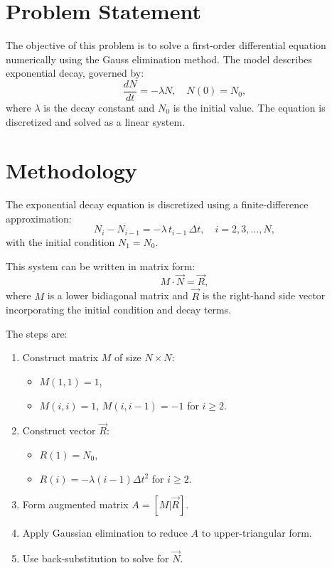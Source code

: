 \section*{Problem Statement} 
The objective of this problem is to solve a first-order differential equation numerically using the Gauss elimination method. The model describes exponential decay, governed by:
\[
\frac{dN}{dt} = -\lambda N, \quad N(0) = N_0,
\]
where $\lambda$ is the decay constant and $N_0$ is the initial value. The equation is discretized and solved as a linear system.

\section*{Methodology} 
The exponential decay equation is discretized using a finite-difference approximation:
\[
N_i - N_{i-1} = -\lambda \, t_{i-1} \, \Delta t, \quad i = 2,3,\ldots,N,
\]
with the initial condition $N_1 = N_0$.

This system can be written in matrix form:
\[
M \cdot \vec{N} = \vec{R},
\]
where $M$ is a lower bidiagonal matrix and $\vec{R}$ is the right-hand side vector incorporating the initial condition and decay terms.

The steps are:
\begin{enumerate}
  \item Construct matrix $M$ of size $N \times N$:
  \begin{itemize}
    \item $M(1,1) = 1$, 
    \item $M(i,i) = 1$, $M(i,i-1) = -1$ for $i \geq 2$.
  \end{itemize}
  \item Construct vector $\vec{R}$:
  \begin{itemize}
    \item $R(1) = N_0$, 
    \item $R(i) = -\lambda (i-1) \Delta t^2$ for $i \geq 2$.
  \end{itemize}
  \item Form augmented matrix $A = [M|\vec{R}]$.
  \item Apply Gaussian elimination to reduce $A$ to upper-triangular form.
  \item Use back-substitution to solve for $\vec{N}$.
\end{enumerate}

